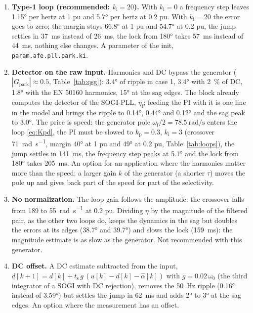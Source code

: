 \documentclass[11pt,a4paper]{scrartcl}
\newcommand{\ped}[1]{_{\mathrm{#1}}}
\newcommand{\code}[1]{\texttt{#1}}
\begin{document}
\begin{onehalfspace}
\begin{enumerate}
	\item \textbf{Type-1 loop (recommended: $k\ped{i} = 20$).} With $k\ped{i} = 0$ a frequency step leaves \ang{1.15} per hertz at \num{1} pu and \ang{5.7} per hertz at \num{0.2} pu. With $k\ped{i} = 20$ the error goes to zero; the margin stays \ang{66.8} at \num{1} pu and \ang{54.7} at \num{0.2} pu, the jump settles in \SI{37}{\milli\second} instead of \SI{26}{\milli\second}, the lock from \ang{180} takes \SI{57}{\milli\second} instead of \SI{44}{\milli\second}, nothing else changes. A parameter of the init, \code{param.afe.pll.park.ki}.
	\item \textbf{Detector on the raw input.} Harmonics and DC bypass the generator ($|G\ped{park}| \approx 0.5$, Table~\ref{tab:qsg}): \ang{3.4} of ripple in case 1, \ang{3.4} with \num{2}~\% of DC, \ang{1.8} with the EN 50160 harmonics, \ang{15} at the sag edges. The block already computes the detector of the SOGI-PLL, $\eta\ped{f}$; feeding the PI with it is one line in the model and brings the ripple to \ang{0.14}, \ang{0.44} and \ang{0.12} and the sag peak to \ang{3.0}. The price is speed: the generator pole $\omega\ped{f}/2 = \SI{78.5}{\radian\per\second}$ enters the loop \eqref{eq:Kpd}, the PI must be slowed to $k\ped{p} = 0.3$, $k\ped{i} = 3$ (crossover \SI{71}{\radian\per\second}, margin \ang{40} at \num{1} pu and \ang{49} at \num{0.2} pu, Table~\ref{tab:loops}), the jump settles in \SI{141}{\milli\second}, the frequency step peaks at \ang{5.1} and the lock from \ang{180} takes \SI{205}{\milli\second}. An option for an application where the harmonics matter more than the speed; a larger gain $k$ of the generator (a shorter $\tau$) moves the pole up and gives back part of the speed for part of the selectivity.
	\item \textbf{No normalization.} The loop gain follows the amplitude: the crossover falls from \SI{189}{} to \SI{55}{\radian\per\second} at \num{0.2} pu. Dividing $\eta$ by the magnitude of the filtered pair, as the other two loops do, keeps the dynamics in the sag but doubles the errors at its edges (\ang{38.7} and \ang{39.7}) and slows the lock (\SI{159}{\milli\second}): the magnitude estimate is as slow as the generator. Not recommended with this generator.
	\item \textbf{DC offset.} A DC estimate subtracted from the input, $d[k+1] = d[k] + t\ped{s}\, g\,(u[k] - d[k] - \hat\alpha[k])$ with $g = 0.02\,\omega_0$ (the third integrator of a SOGI with DC rejection), removes the \SI{50}{\hertz} ripple (\ang{0.16} instead of \ang{3.59}) but settles the jump in \SI{62}{\milli\second} and adds \ang{2} to \ang{3} at the sag edges. An option where the measurement has an offset.
\end{enumerate}


\end{onehalfspace}
\end{document}
